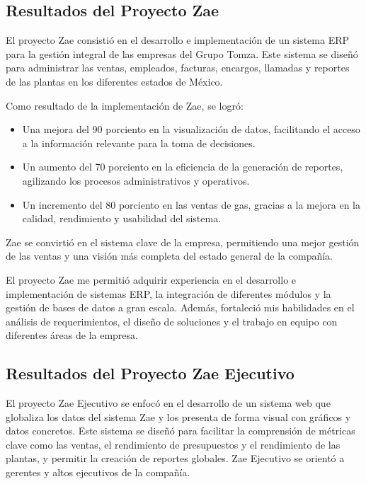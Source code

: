 \documentclass[protocolo.tex]{subfiles}
\begin{document}
\subsection{Resultados del Proyecto Zae}

El proyecto Zae consistió en el desarrollo e implementación de un sistema ERP para la gestión integral de las empresas del Grupo Tomza. Este sistema se diseñó para administrar las ventas, empleados, facturas, encargos, llamadas y reportes de las plantas en los diferentes estados de México.

Como resultado de la implementación de Zae, se logró:

\begin{itemize}
\item Una mejora del 90 porciento en la visualización de datos,  facilitando el acceso a la información relevante para la toma de decisiones.
\item Un aumento del 70 porciento en la eficiencia de la generación de reportes,  agilizando los procesos administrativos y operativos.
\item Un incremento del 80 porciento en las ventas de gas,  gracias a la mejora en la calidad, rendimiento y usabilidad del sistema.
\end{itemize}

Zae se convirtió en el sistema clave de la empresa,  permitiendo una mejor gestión de las ventas y una visión más completa del estado general de la compañía.

El proyecto Zae me permitió adquirir experiencia en el desarrollo e implementación de sistemas ERP,  la integración de diferentes módulos y la gestión de bases de datos a gran escala.  Además,  fortaleció mis habilidades en el análisis de requerimientos,  el diseño de soluciones  y  el  trabajo  en  equipo  con  diferentes  áreas  de  la  empresa.


\subsection{Resultados del Proyecto Zae Ejecutivo}

El proyecto Zae Ejecutivo se enfocó en el desarrollo de un sistema web que globaliza los datos del sistema Zae y los presenta de forma visual con gráficos  y  datos  concretos.  Este sistema se diseñó para  facilitar  la  comprensión  de  métricas  clave  como  las  ventas,  el  rendimiento  de  presupuestos  y  el  rendimiento  de  las  plantas,  y  permitir  la  creación  de  reportes  globales.  Zae  Ejecutivo  se  orientó  a  gerentes  y  altos  ejecutivos  de  la  compañía.
\end{document}
